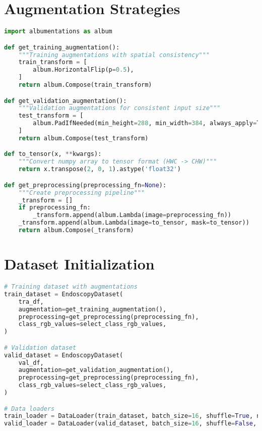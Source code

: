 \documentclass[12pt,a4paper]{report}
\begin{document}
\section{Augmentation Strategies}
\begin{lstlisting}[language=Python, caption=Augmentation Functions]
import albumentations as album

def get_training_augmentation():
    """Training augmentations with spatial consistency"""
    train_transform = [
        album.HorizontalFlip(p=0.5),
    ]
    return album.Compose(train_transform)

def get_validation_augmentation():
    """Validation augmentations for consistent input size"""
    test_transform = [
        album.PadIfNeeded(min_height=288, min_width=384, always_apply=True, border_mode=0),
    ]
    return album.Compose(test_transform)

def to_tensor(x, **kwargs):
    """Convert numpy array to tensor format (HWC -> CHW)"""
    return x.transpose(2, 0, 1).astype('float32')

def get_preprocessing(preprocessing_fn=None):
    """Create preprocessing pipeline"""
    _transform = []
    if preprocessing_fn:
        _transform.append(album.Lambda(image=preprocessing_fn))
    _transform.append(album.Lambda(image=to_tensor, mask=to_tensor))
    return album.Compose(_transform)
\end{lstlisting}

\section{Dataset Initialization}
\begin{lstlisting}[language=Python, caption=Dataset Creation]
# Training dataset with augmentations
train_dataset = EndoscopyDataset(
    tra_df,
    augmentation=get_training_augmentation(),
    preprocessing=get_preprocessing(preprocessing_fn),
    class_rgb_values=select_class_rgb_values,
)

# Validation dataset
valid_dataset = EndoscopyDataset(
    val_df,
    augmentation=get_validation_augmentation(),
    preprocessing=get_preprocessing(preprocessing_fn),
    class_rgb_values=select_class_rgb_values,
)

# Data loaders
train_loader = DataLoader(train_dataset, batch_size=16, shuffle=True, num_workers=4)
valid_loader = DataLoader(valid_dataset, batch_size=16, shuffle=False, num_workers=4)
\end{lstlisting}
\end{document}
